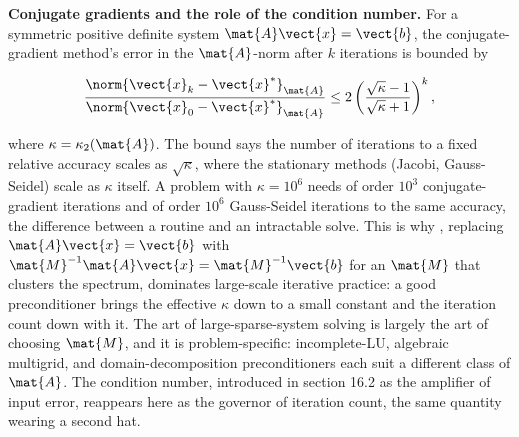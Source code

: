 \begin{mastery}
\textbf{Conjugate gradients and the role of the condition number.}
For a symmetric positive definite system $\mat{A}\vect{x} =
\vect{b}$, the conjugate-gradient method's error in the
$\mat{A}$-norm after $k$ iterations is bounded by

\[
\frac{\norm{\vect{x}_{k} - \vect{x}^{*}}_{\mat{A}}}
{\norm{\vect{x}_{0} - \vect{x}^{*}}_{\mat{A}}}
\leq 2 \left(\frac{\sqrt{\kappa} - 1}{\sqrt{\kappa} + 1}\right)^{k},
\]

where $\kappa = \kappa_{2}(\mat{A})$. The bound says the number of
iterations to a fixed relative accuracy scales as $\sqrt{\kappa}$,
where the stationary methods (Jacobi, Gauss-Seidel) scale as
$\kappa$ itself. A problem with $\kappa = 10^{6}$ needs of order
$10^{3}$ conjugate-gradient iterations and of order $10^{6}$
Gauss-Seidel iterations to the same accuracy, the difference between
a routine and an intractable solve. This is why ,
replacing $\mat{A}\vect{x} = \vect{b}$ with $\mat{M}^{-1}\mat{A}
\vect{x} = \mat{M}^{-1}\vect{b}$ for an $\mat{M}$ that clusters the
spectrum, dominates large-scale iterative practice: a good
preconditioner brings the effective $\kappa$ down to a small
constant and the iteration count down with it. The art of
large-sparse-system solving is largely the art of choosing $\mat{M}$,
and it is problem-specific: incomplete-LU, algebraic multigrid, and
domain-decomposition preconditioners each suit a different class of
$\mat{A}$. The condition number, introduced in section 16.2 as the
amplifier of input error, reappears here as the governor of
iteration count, the same quantity wearing a second hat.
\end{mastery}


